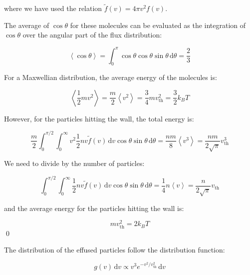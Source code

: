 \documentclass[12pt]{article}
\begin{document}
where we have used the relation $\tilde{f}(v) = 4\pi v^{2} f(v)$.

The average of $\cos{\theta}$ for these molecules can be evaluated as the integration of $\cos{\theta}$ over the angular part of the flux distribution:

\begin{equation}
    \left\langle \cos{\theta} \right\rangle = \int_{0}^{\pi} \cos{\theta} \cos{\theta} \sin{\theta} \, \mathrm{d}\theta = \frac{2}{3}
\end{equation}

For a Maxwellian distribution, the average energy of the molecules is:

\begin{equation}
    \left\langle \frac{1}{2} m v^{2} \right\rangle = \frac{m}{2} \left\langle v^{2} \right\rangle = \frac{3}{4} m v_{\text{th}}^{2} = \frac{3}{2} k_{B} T
\end{equation}

However, for the particles hitting the wall, the total energy is:

\begin{equation}
    \frac{m}{2} \int_{0}^{\pi/2} \int_{0}^{\infty} v^{2} \frac{1}{2} nv \tilde{f}(v) \, \mathrm{d}v \cos{\theta} \sin{\theta} \, \mathrm{d}\theta = \frac{nm}{8} \left\langle v^{3} \right\rangle = \frac{nm}{2\sqrt{\pi}} v_{\text{th}}^{3}
\end{equation}

We need to divide by the number of particles:

\begin{equation}
    \int_{0}^{\pi/2} \int_{0}^{\infty} \frac{1}{2} nv \tilde{f}(v) \, \mathrm{d}v \cos{\theta} \sin{\theta} \, \mathrm{d}\theta = \frac{1}{4} n \left\langle v \right\rangle = \frac{n}{2\sqrt{\pi}} v_{\text{th}}
\end{equation}

and the average energy for the particles hitting the wall is:

\begin{equation}
    mv_{\text{th}}^{2} = 2k_{B} T
\end{equation}
\qed



The distribution of the effused particles follow the distribution function:

\begin{equation}
    g(v) \, \mathrm{d}v \propto v^{3} e^{-v^{2}/v_{\text{th}}^{2}} \, \mathrm{d}v
\end{equation}
\end{document}
